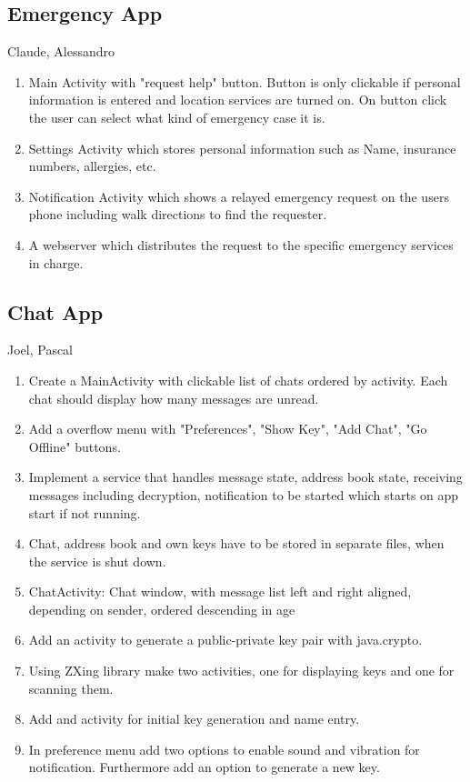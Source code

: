 		
		\subsection{Emergency App}
			Claude, Alessandro
			\begin{enumerate}
				\item Main Activity with "request help" button. Button is only clickable if personal information is entered and location services are turned on. On button click the user can select what kind of emergency case it is.
				\item Settings Activity which stores personal information such as Name, insurance numbers, allergies, etc.
				\item Notification Activity which shows a relayed emergency request on the users phone including walk directions to find the requester.
				\item A webserver which distributes the request to the specific emergency services in charge.
			\end{enumerate}
		
		\subsection{Chat App}
			Joel, Pascal
			\begin{enumerate}
				\item Create a MainActivity with clickable list of chats ordered by activity. Each chat should display how many messages are unread.
				\item Add a overflow menu with "Preferences", "Show Key", "Add Chat", "Go Offline" buttons.
				\item Implement a service that handles message state, address book state, receiving messages including decryption, notification to be started which starts on app start if not running.
				\item Chat, address book and own keys have to be stored in separate files, when the service is shut down.
				\item ChatActivity: Chat window, with message list left and right aligned, depending on sender, ordered descending in age
				\item Add an activity to generate a public-private key pair with java.crypto.
				\item Using ZXing library make two activities, one for displaying keys and one for scanning them.
				\item Add and activity for initial key generation and name entry.
				\item In preference menu add two options to enable sound and vibration for notification. Furthermore add an option to generate a new key.
			\end{enumerate}
			